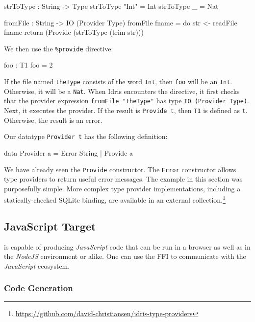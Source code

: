 \begin{code}
strToType : String -> Type
strToType "Int" = Int
strToType _ = Nat

fromFile : String -> IO (Provider Type)
fromFile fname = do str <- readFile fname
                    return (Provide (strToType (trim str)))
\end{code}

We then use the \texttt{\%provide} directive:

\begin{code}

foo : T1
foo = 2
\end{code}

\noindent
If the file named \texttt{theType} consists of the word \texttt{Int}, then
\texttt{foo} will be an \texttt{Int}. Otherwise, it will be a \texttt{Nat}.
When Idris encounters the directive, it first checks that the provider
expression \texttt{fromFile "theType"} has type \texttt{IO (Provider
  Type)}. Next, it executes the provider. If the result is \texttt{Provide t},
then \texttt{T1} is defined as \texttt{t}. Otherwise, the result is an error.

Our datatype \texttt{Provider t} has the following definition:

\begin{code}
data Provider a = Error String
                | Provide a
\end{code}

\noindent
We have already seen the \texttt{Provide} constructor. The \texttt{Error}
constructor allows type providers to return useful error messages.  The
example in this section was purposefully simple. More complex type provider
implementations, including a statically-checked SQLite binding, are available
in an external collection.\footnote{\url{https://github.com/david-christiansen/idris-type-providers}}

\subsection{JavaScript Target}

\Idris{} is capable of producing \emph{JavaScript} code that can be run in a browser
as well as in the \emph{NodeJS} environment or alike. One can use the FFI to
communicate with the \emph{JavaScript} ecosystem.

\subsubsection*{Code Generation}

